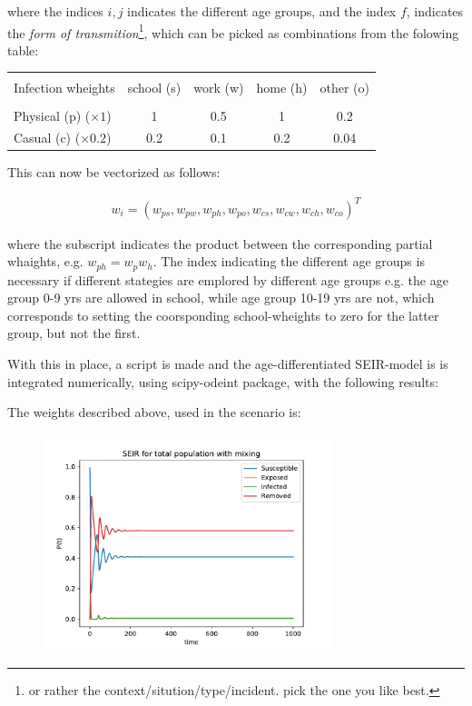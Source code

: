 where the indices $i,j$ indicates the different age groups, and the index $f$, indicates the \textit{form of transmition}\footnote{or rather the context/sitution/type/incident. pick the one you like best.}, which can be picked as combinations from the folowing table:

\begin{table}[H]
\centering
\begin{tabular}{l | *{4}{c}}
\hline \\
Infection wheights & school (s) & work (w) & home (h) & other (o) \\
\hline \\
Physical (p) ($\times 1$)& 1 & 0.5 & 1 & 0.2 \\
Casual (c) ($\times 0.2$) & 0.2 & 0.1 & 0.2 & 0.04
\end{tabular}
\end{table}
This can now be vectorized as follows:

\begin{align*}
w_{i} = (w_{ps}, w_{pw}, w_{ph}, w_{po}, w_{cs}, w_{cw}, w_{ch}, w_{co})^{T}
\end{align*}

where the subscript indicates the product between the corresponding partial whaights, e.g. $w_{ph} = w_{p} w_{h}$.
The index indicating the different age groups is necessary if different stategies are emplored by different age groups e.g. the age group 0-9 yrs are allowed in school, while age group 10-19 yrs are not, which corresponds to setting the coorsponding school-wheights to zero for the latter group, but not the first.

With this in place, a script is made and the age-differentiated SEIR-model is is integrated numerically, using scipy-odeint package, with the following results:

\newpage

The weights described above, used in the scenario is:
\begin{table}[H]
\centering

\end{table}

\begin{figure}[H]
\centering
\includegraphics[width = 0.75\textwidth]{../fig/SEIR_total_population_mix_n.pdf}
\caption{
\protect 
\label{fig:total_pop_mix_n}}
\end{figure}

